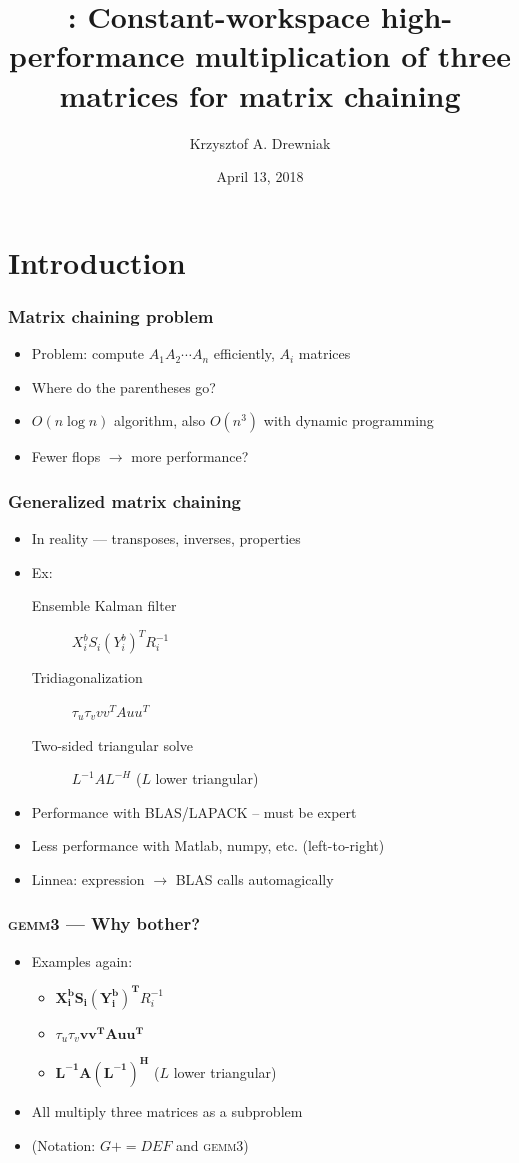 \documentclass{beamer}
\title[\gemmt{}]{\gemmt{}: Constant-workspace high-performance multiplication of three matrices for matrix chaining}
\author[Drewniak]{Krzysztof A. Drewniak}
\institute[UT Austin]{The University of Texas at Austin}
\date[]{April 13, 2018}
\newcommand*{\pluseq}{\mathrel{{+}{=}}}
\newcommand*{\gemmt}{{\textsc{gemm3}}}
\begin{document}
\begin{frame}[plain]
  \titlepage{}
\end{frame}

\section[Introduction]{Introduction}
\begin{frame}
  \frametitle{Matrix chaining problem}
  \begin{itemize}
  \item Problem: compute $A_1A_2\cdots A_n$ efficiently, $A_i$ matrices
  \item Where do the parentheses go?
  \item $O(n \log n)$ algorithm, also $O(n^3)$ with dynamic programming
  \item Fewer flops $\to$ more performance?
  \end{itemize}
\end{frame}

\begin{frame}
  \frametitle{Generalized matrix chaining}
  \begin{itemize}
  \item In reality --- transposes, inverses, properties
  \item Ex:
    \begin{description}
    \item[Ensemble Kalman filter] $X_i^b S_i (Y_i^b)^T R_i^{-1}$
    \item[Tridiagonalization] $\tau_u\tau_vvv^TAuu^T$
    \item[Two-sided triangular solve] $L^{-1}AL^{-H}$ ($L$ lower triangular)
    \end{description}
  \item Performance with BLAS/LAPACK -- must be expert
  \item Less performance with  Matlab, numpy, etc. (left-to-right)
  \item Linnea: expression $\to$ BLAS calls automagically
  \end{itemize}
\end{frame}

\begin{frame}
  \frametitle{\gemmt{} --- Why bother?}
  \begin{itemize}
  \item Examples again:
    \begin{itemize}
    \item $\bm{X_i^b S_i (Y_i^b)^T}R_i^{-1}$
    \item $\tau_u\tau_v \bm{vv^TAuu^T}$
    \item$\bm{L^{-1}A(L^{-1})^H}$ ($L$ lower triangular)
    \end{itemize}
  \item All multiply three matrices as a subproblem
  \item (Notation: $G \pluseq DEF$ and \gemmt{})
  \end{itemize}
\end{frame}
\end{document}
